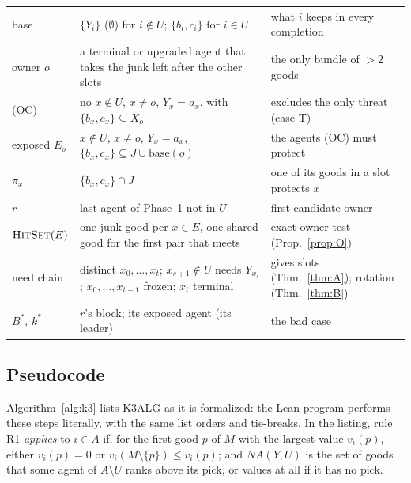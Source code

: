 \documentclass[runningheads,11pt]{llncs}
\newcommand{\NA}{\mathit{NA}}
\newcommand{\base}{\mathrm{base}}
\newcommand{\HitSet}{\textup{\textsc{HitSet}}}
\begin{document}
\begin{table}[p]
\begin{tabular}{@{}>{\raggedright\arraybackslash}p{}>{\raggedright\arraybackslash}p{}>{\raggedright\arraybackslash}p{}@{}}
base & $\{Y_i\}$ ($\emptyset$) for $i\notin U$; $\{b_i,c_i\}$ for $i\in U$ & what $i$ keeps in every completion \\
owner $o$ & a terminal or upgraded agent that takes the junk left after the other slots & the only bundle of $>2$ goods \\
(OC) & no $x\notin U$, $x\ne o$, $Y_x=a_x$, with $\{b_x,c_x\}\subseteq X_o$ & excludes the only threat (case T) \\
exposed $E_o$ & $x\notin U$, $x\ne o$, $Y_x=a_x$, $\{b_x,c_x\}\subseteq J\cup\base(o)$ & the agents (OC) must protect \\
$\pi_x$ & $\{b_x,c_x\}\cap J$ & one of its goods in a slot protects $x$ \\
$r$ & last agent of Phase~1 not in $U$ & first candidate owner \\
$\HitSet(E)$ & one junk good per $x\in E$, one shared good for the first pair that meets & exact owner test (Prop.~\ref{prop:O}) \\
need chain & distinct $x_0,\dots,x_t$; $x_{s+1}\notin U$ needs $Y_{x_s}$; $x_0,\dots,x_{t-1}$ frozen; $x_t$ terminal & gives slots (Thm.~\ref{thm:A}); rotation (Thm.~\ref{thm:B}) \\
$B^*$, $k^*$ & $r$'s block; its exposed agent (its leader) & the bad case \\
\bottomrule
\end{tabular}
\end{table}

\subsection{Pseudocode}\label{sec:pseudo}

Algorithm~\ref{alg:k3} lists K3ALG as it is formalized: the Lean program  performs these steps literally, with the same list orders and tie-breaks. In the listing, rule R1 \emph{applies} to $i\in A$ if, for the first good $p$ of $M$ with the largest value $v_i(p)$, either $v_i(p)=0$ or $v_i(M\setminus\{p\})\le v_i(p)$; and $\NA(Y,U)$ is the set of goods that some agent of $A\setminus U$ ranks above its pick, or values at all if it has no pick.
\end{document}
